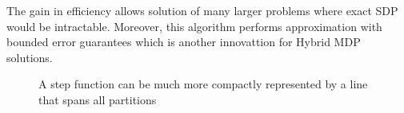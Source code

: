 The gain in efficiency allows solution of many larger problems where exact SDP would be intractable. Moreover, this algorithm performs approximation with bounded error guarantees which is another innovattion for Hybrid MDP solutions.

\begin{figure}[!ht]
\centering
\begin{minipage}{.3\textwidth}
  \centering
\end{minipage}
\begin{minipage}{.3\textwidth}
\centering
{}
\end{minipage}
\caption{A step function can be much more compactly represented by a line that spans all partitions}
 \label{steppair1}
\end{figure}
